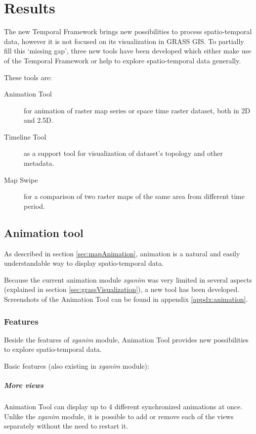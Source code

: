 \documentclass[a4paper,12pt,oneside]{book}
\newcommand{\module}[1]{\textsl{#1}}
\newcommand{\tf}{Temporal Framework\xspace}
\newcommand{\at}{Animation Tool\xspace}
\newcommand{\ms}{Map Swipe\xspace}
\begin{document}



\chapter{Results}%
\label{chap:results}
The new \tf brings new possibilities to process spatio-temporal data,
however it is not focused on its visualization in GRASS GIS. To partially fill this `missing gap',
three new tools have been developed which either make use of the \tf
or help to explore spatio-temporal data generally.

These tools are:
\begin{description}
    \item[\at]for animation of raster map series or space time raster dataset, both in 2D and 2.5D.
    \item[Timeline Tool] as a support tool for visualization of dataset's topology and other metadata.
    \item[\ms]for a comparison of two raster maps of the same area from different time period.
\end{description}

\section{Animation tool}
\label{sec:animationTool}
As described in section \ref{sec:mapAnimation},
animation is a natural and easily understandable way to display spatio-temporal data.

Because the current animation module \module{xganim} was very limited
in several aspects (explained in section \ref{sec:grassVisualization}),
a new tool has been developed.
Screenshots of the \at can be found in appendix \ref{appdx:animation}.

\subsection{Features}
Beside the features of \module{xganim} module, \at provides new possibilities
to explore spatio-temporal data.

Basic features (also existing in \module{xganim} module):
\paragraph{More views}
\at can display up to 4 different synchronized animations at once.
Unlike the \module{xganim} module, it is possible to add or remove each of the views separately
without the need to restart it.
\end{document}

